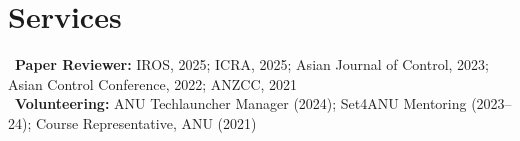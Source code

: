 \section*{Services}
\textbullet~\textbf{Paper Reviewer:} IROS, 2025; ICRA, 2025; Asian Journal of Control, 2023; Asian Control Conference, 2022; ANZCC, 2021\\[0.5em]
\textbullet~\textbf{Volunteering:} ANU Techlauncher Manager (2024); Set4ANU Mentoring (2023--24); Course Representative, ANU (2021)
